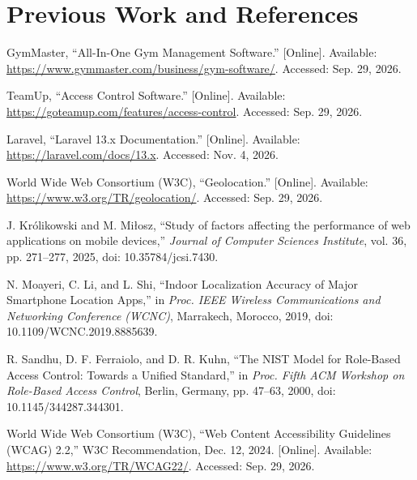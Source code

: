 \section{Previous Work and References}

\begingroup\sloppy
\begin{enumerate}[label={[\arabic*]},leftmargin=2.2em,itemsep=6pt]

\item GymMaster, ``All-In-One Gym Management Software.'' [Online]. Available: \url{https://www.gymmaster.com/business/gym-software/}. Accessed: Sep. 29, 2026.

\item TeamUp, ``Access Control Software.'' [Online]. Available: \url{https://goteamup.com/features/access-control}. Accessed: Sep. 29, 2026.

\item Laravel, ``Laravel 13.x Documentation.'' [Online]. Available: \url{https://laravel.com/docs/13.x}. Accessed: Nov. 4, 2026.

\item World Wide Web Consortium (W3C), ``Geolocation.'' [Online]. Available: \url{https://www.w3.org/TR/geolocation/}. Accessed: Sep. 29, 2026.

\item J. Królikowski and M. Miłosz, ``Study of factors affecting the performance of web applications on mobile devices,'' \textit{Journal of Computer Sciences Institute}, vol. 36, pp. 271--277, 2025, doi: 10.35784/jcsi.7430.

\item N. Moayeri, C. Li, and L. Shi, ``Indoor Localization Accuracy of Major Smartphone Location Apps,'' in \textit{Proc. IEEE Wireless Communications and Networking Conference (WCNC)}, Marrakech, Morocco, 2019, doi: 10.1109/WCNC.2019.8885639.

\item R. Sandhu, D. F. Ferraiolo, and D. R. Kuhn, ``The NIST Model for Role-Based Access Control: Towards a Unified Standard,'' in \textit{Proc. Fifth ACM Workshop on Role-Based Access Control}, Berlin, Germany, pp. 47--63, 2000, doi: 10.1145/344287.344301.

\item World Wide Web Consortium (W3C), ``Web Content Accessibility Guidelines (WCAG) 2.2,'' W3C Recommendation, Dec. 12, 2024. [Online]. Available: \url{https://www.w3.org/TR/WCAG22/}. Accessed: Sep. 29, 2026.


\end{enumerate}

